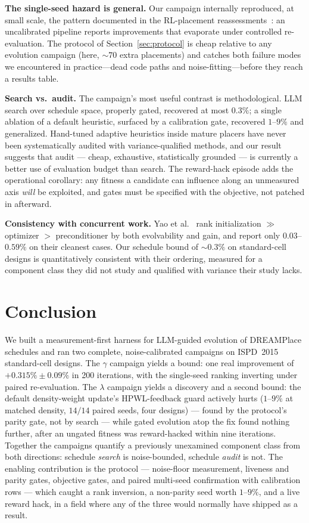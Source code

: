 \documentclass[conference]{IEEEtran}
\begin{document}
\textbf{The single-seed hazard is general.} Our campaign internally
reproduced, at small scale, the pattern documented in the RL-placement
reassessments~\cite{cheng2023assessment,markov2023false}: an uncalibrated
pipeline reports improvements that evaporate under controlled
re-evaluation. The protocol of Section~\ref{sec:protocol} is cheap
relative to any evolution campaign (here, ${\sim}70$ extra placements)
and catches both failure modes we encountered in practice---dead code
paths and noise-fitting---before they reach a results table.

\textbf{Search vs.\ audit.} The campaign's most useful contrast is
methodological. LLM search over schedule space, properly gated, recovered
at most $0.3\%$; a single ablation of a default heuristic, surfaced by a
calibration gate, recovered $1$--$9\%$ and generalized. Hand-tuned
adaptive heuristics inside mature placers have never been systematically
audited with variance-qualified methods, and our result suggests that
audit --- cheap, exhaustive, statistically grounded --- is currently a
better use of evaluation budget than search. The reward-hack episode adds
the operational corollary: any fitness a candidate can influence along an
unmeasured axis \emph{will} be exploited, and gates must be specified
with the objective, not patched in afterward.

\textbf{Consistency with concurrent work.} Yao et
al.~\cite{yao2025evolution} rank initialization $\gg$ optimizer $>$
preconditioner by both evolvability and gain, and report only
$0.03$--$0.59\%$ on their cleanest cases. Our schedule bound of
${\sim}0.3\%$ on standard-cell designs is quantitatively consistent with
their ordering, measured for a component class they did not study and
qualified with variance their study lacks.

\section{Conclusion}

We built a measurement-first harness for LLM-guided evolution of
DREAMPlace schedules and ran two complete, noise-calibrated campaigns on
ISPD~2015 standard-cell designs. The $\gamma$ campaign yields a bound:
one real improvement of $+0.315\%\pm0.09\%$ in 200 iterations, with the
single-seed ranking inverting under paired re-evaluation. The $\lambda$
campaign yields a discovery and a second bound: the default density-weight
update's HPWL-feedback guard actively hurts ($1$--$9\%$ at matched
density, $14/14$ paired seeds, four designs) --- found by the protocol's
parity gate, not by search --- while gated evolution atop the fix found
nothing further, after an ungated fitness was reward-hacked within nine
iterations. Together the campaigns quantify a previously unexamined
component class from both directions: schedule \emph{search} is
noise-bounded, schedule \emph{audit} is not. The enabling contribution is
the protocol --- noise-floor measurement, liveness and parity gates,
objective gates, and paired multi-seed confirmation with calibration
rows --- which caught a rank inversion, a non-parity seed worth $1$--$9\%$,
and a live reward hack, in a field where any of the three would normally
have shipped as a result.
\end{document}
